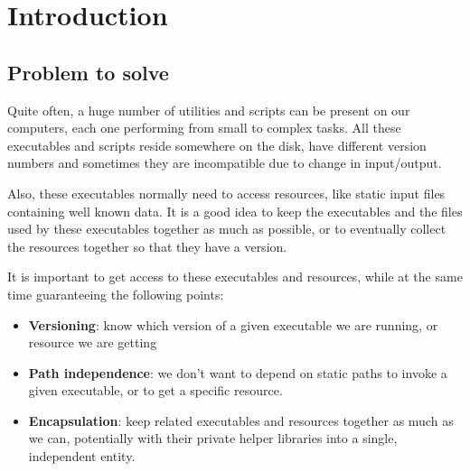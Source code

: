 \section{Introduction}

\subsection{Problem to solve}

Quite often, a huge number of utilities and scripts can be present on our
computers, each one performing from small to complex tasks. All these
executables and scripts reside somewhere on the disk, have different version
numbers and sometimes they are incompatible due to change in input/output.

Also, these executables normally need to access resources, like static
input files containing well known data.  It is a good idea to keep
the executables and the files used by these executables together as much as
possible, or to eventually collect the resources together so that they have
a version.

It is important to get access to these executables and resources, while at
the same time guaranteeing the following points:

\begin{itemize}
\item \textbf{Versioning}: know which version of a given executable we are running, or resource
we are getting
\item \textbf{Path independence}: we don't want to depend on static paths to
invoke a given executable, or to get a specific resource.
\item \textbf{Encapsulation}: keep related executables and resources
together as much as we can, potentially with their private helper libraries
into a single, independent entity.
\end{itemize}

